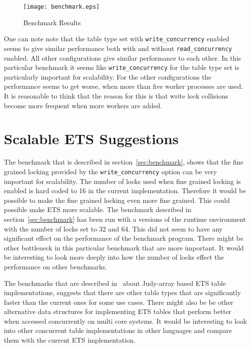 \documentclass[aps,pre,preprint,nofootinbib]{revtex4}
\begin{document}
  
\begin{figure}[htb]
\centering
\texttt{[image: benchmark.eps]}
\caption{Benchmark Results} 
\label{fig:benchmark_results}
\end{figure}

  One can note note that the table type set with \verb|write_concurrency| enabled seems to give similar performance both with and without \verb|read_concurrency| enabled.
  All other configurations give similar performance to each other.
  In this particular benchmark it seems like \verb|write_concurrency| for the table type set is particularly important for scalability.
  For the other configurations the performance seems to get worse, when more than five worker processes are used.
  It is reasonable to think that the reason for this is that write lock collisions become more frequent when more workers are added.
  
  
  
\section{Scalable ETS Suggestions}

  The benchmark that is described in section~\ref{sec:benchmark}, shows that the fine grained locking provided by the \verb|write_concurrency| option can be very important for scalability.
  The number of locks used when fine grained locking is enabled is hard coded to 16 in the current implementation.
  Therefore it would be possible to make the fine grained locking even more fine grained.
  This could possible make ETS more scalable.
  The benchmark described in section~\ref{sec:benchmark} has been run with a versions of the runtime environment with the number of locks set to 32 and 64.
  This did not seem to have any significant effect on the performance of the benchmark program.
  There might be other bottleneck in this particular benchmark that are more important.
  It would be interesting to look more deeply into how the number of locks effect the performance on other benchmarks.
  
  
  The benchmarks that are described in~\cite{ScottEtsJudy} about Judy-array based ETS table implementations, suggests that there are other table types that are significantly faster than the current ones for some use cases.
  There might also be be other alternative data structures for implementing ETS tables that perform better when accessed concurrently on multi core systems.
  It would be interesting to look into other concurrent table implementations in other languages and compare them with the current ETS implementation.
  
\end{document}
